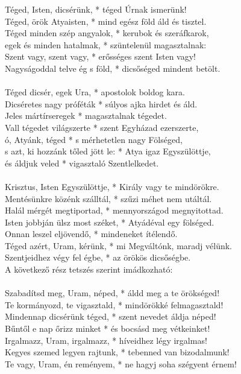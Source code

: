 \documentclass[twoside]{article}
\begin{document}
Téged, Isten, dicsérünk, * téged Úrnak ismerünk!\\
Téged, örök Atyaisten, * mind egész föld áld és tisztel.\\
Téged minden szép angyalok, * kerubok és szeráfkarok,\\
egek és minden hatalmak, * szüntelenül magasztalnak:\\
Szent vagy, szent vagy, * erősséges szent Isten vagy!\\
Nagyságoddal telve ég s föld, * dicsőséged mindent betölt.\\
\\
Téged dicsér, egek Ura, * apostolok boldog kara.\\
Dicséretes nagy próféták * súlyos ajka hirdet és áld.\\
Jeles mártírseregek * magasztalnak tégedet.\\
Vall tégedet világszerte * szent Egyházad ezerszerte,\\
ó, Atyánk, téged * s mérhetetlen nagy Fölséged,\\
s azt, ki hozzánk tőled jött le: * Atya igaz Egyszülöttje,\\
és áldjuk veled * vigasztaló Szentlelkedet.\\
\\
Krisztus, Isten Egyszülöttje, * Király vagy te mindörökre.\\
Mentésünkre közénk szálltál, * szűzi méhet nem utáltál.\\
Halál mérgét megtiportad, * mennyországod megnyitottad.\\
Isten jobbján ülsz most széket, * Atyádéval egy fölséged.\\
Onnan leszel eljövendő, * mindeneket ítélendő.\\
Téged azért, Uram, kérünk, * mi Megváltónk, maradj vélünk.\\
Szentjeidhez végy fel égbe, * az örökös dicsőségbe.\\
A következő rész tetszés szerint imádkozható:\\
\\
Szabadítsd meg, Uram, néped, * áldd meg a te örökséged!\\
Te kormányozd, te vigasztald, * mindörökké felmagasztald!\\
Mindennap dicsérünk téged, * szent nevedet áldja néped!\\
Bűntől e nap őrizz minket * és bocsásd meg vétkeinket!\\
Irgalmazz, Uram, irgalmazz, * híveidhez légy irgalmas!\\
Kegyes szemed legyen rajtunk, * tebenned van bizodalmunk!\\
Te vagy, Uram, én reményem, * ne hagyj soha szégyent érnem!\\
\end{document}
